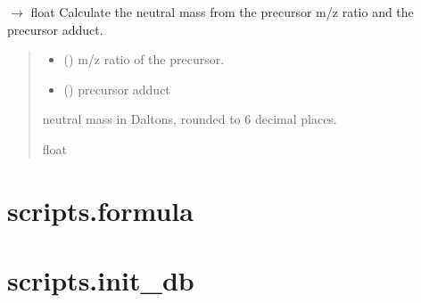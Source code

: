 \documentclass[letterpaper,10pt,english]{sphinxmanual}
\begin{document}
\begin{fulllineitems}
\label{\detokenize{api:utils.neutral_mass.neutral_mass}}
\pysigstartsignatures
\pysiglinewithargsret
{}
{\sphinxparamcomma {}}
{{ $\rightarrow$ float}}
\pysigstopsignatures
\sphinxAtStartPar
Calculate the neutral mass from the precursor m/z ratio and the precursor adduct.
\begin{quote}\begin{description}
\begin{itemize}
\item {} 
\sphinxAtStartPar
{} () \textendash{} m/z ratio of the precursor.

\item {} 
\sphinxAtStartPar
{} () \textendash{} precursor adduct

\end{itemize}

\sphinxAtStartPar
neutral mass in Daltons, rounded to 6 decimal places.

\sphinxAtStartPar
float

\end{description}\end{quote}

\end{fulllineitems}



\section{scripts.formula}
\label{\detokenize{api:scripts-formula}}

\section{scripts.init\_db}
\label{\detokenize{api:module-scripts.init_db}}\label{\detokenize{api:scripts-init-db}}
\end{document}
